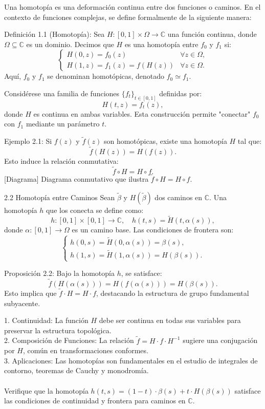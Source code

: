 \documentclass{article}
\begin{document}
Una homotopía es una deformación continua entre dos funciones o caminos. En el contexto de funciones complejas, se define formalmente de la siguiente manera:  

Definición 1.1 (Homotopía):  
Sea \( H: [0,1] \times \Omega \rightarrow \mathbb{C} \) una función continua, donde \( \Omega \subseteq \mathbb{C} \) es un dominio. Decimos que \( H \) es una homotopía entre \( f_0 \) y \( f_1 \) si:  
\[
\begin{cases}
H(0, z) = f_0(z) & \forall z \in \Omega, \\
H(1, z) = f_1(z) = f(H(z)) & \forall z \in \Omega.
\end{cases}
\]  
Aquí, \( f_0 \) y \( f_1 \) se denominan homotópicas, denotado \( f_0 \simeq f_1 \).  

Considérese una familia de funciones \( \{f_t\}_{t \in [0,1]} \) definidas por:  
\[
H(t, z) = f_t(z),
\]  
donde \( H \) es continua en ambas variables. Esta construcción permite "conectar" \( f_0 \) con \( f_1 \) mediante un parámetro \( t \).  

Ejemplo 2.1:  
Si \( f(z) \) y \( \tilde{f}(z) \) son homotópicas, existe una homotopía \( H \) tal que:  
\[
\tilde{f}(H(z)) = H(f(z)).
\]  
Esto induce la relación conmutativa:  
\[
\tilde{f} \circ H = H \circ f.
\]  
[Diagrama]  
Diagrama conmutativo que ilustra \( \tilde{f} \circ H = H \circ f \).  



 2.2 Homotopía entre Caminos  
Sean \( \tilde{\beta} \) y \( H(\tilde{\beta}) \) dos caminos en \( \mathbb{C} \). Una homotopía \( h \) que los conecta se define como:  
\[
h: [0,1] \times [0,1] \rightarrow \mathbb{C}, \quad h(t, s) = \tilde{H}(t, \alpha(s)),
\]  
donde \( \alpha: [0,1] \rightarrow \Omega \) es un camino base. Las condiciones de frontera son:  
\[
\begin{cases}
h(0, s) = \tilde{H}(0, \alpha(s)) = \beta(s), \\
h(1, s) = \tilde{H}(1, \alpha(s)) = H(\beta(s)).
\end{cases}
\]  

Proposición 2.2:  
Bajo la homotopía \( h \), se satisface:  
\[
\tilde{f}(H(\alpha(s))) = H(f(\alpha(s))) = H(\beta(s)).
\]  
Esto implica que \( \tilde{f} \cdot H = H \cdot f \), destacando la estructura de grupo fundamental subyacente.  



1. Continuidad: La función \( H \) debe ser continua en todas sus variables para preservar la estructura topológica.  \\
2. Composición de Funciones: La relación \( \tilde{f} = H \cdot f \cdot H^{-1} \) sugiere una conjugación por \( H \), común en transformaciones conformes.  \\
3. Aplicaciones: Las homotopías son fundamentales en el estudio de integrales de contorno, teoremas de Cauchy y monodromía.  \\\\



Verifique que la homotopía \( h(t, s) = (1 - t) \cdot \beta(s) + t \cdot H(\beta(s)) \) satisface las condiciones de continuidad y frontera para caminos en \( \mathbb{C} \).  

    
\end{document}
